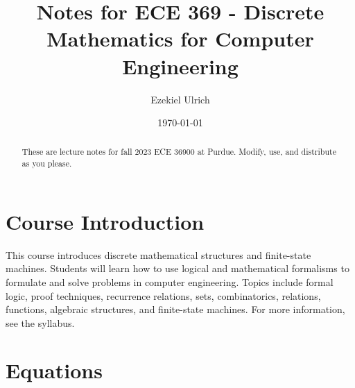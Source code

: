 \documentclass[nobib]{tufte-handout}
\title{Notes for ECE 369 - Discrete Mathematics for Computer Engineering}
\author[Ezekiel Ulrich]{Ezekiel Ulrich}
\date{\today}  %
\begin{document}
\maketitle

\begin{abstract}
These are lecture notes for fall 2023 ECE 36900 at Purdue. Modify, use, and distribute as you please.
\end{abstract}

\tableofcontents

\section{Course Introduction}

This course introduces discrete mathematical structures and 
finite-state machines. Students will learn how to use logical 
and mathematical formalisms to formulate and solve problems in 
computer engineering. Topics include formal logic, proof techniques, 
recurrence relations, sets, combinatorics, relations, functions, 
algebraic structures, and finite-state machines. For more information,
see the syllabus. 

\section{Equations}
\end{document}
